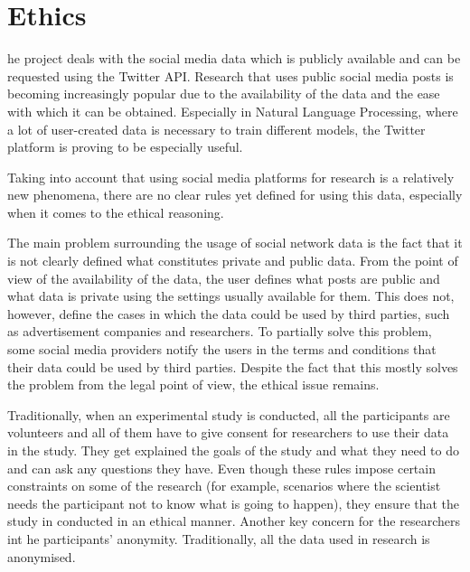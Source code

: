 \let\textcircled=\pgftextcircled
\chapter{Ethics}
\label{chap:ethics}

he project deals with the social media data which is publicly available and can be requested using the Twitter API. Research that uses public social media posts is becoming increasingly popular due to the availability of the data and the ease with which it can be obtained. Especially in Natural Language Processing, where a lot of user-created data is necessary to train different models, the Twitter platform is proving to be especially useful. 

Taking into account that using social media platforms for research is a relatively new phenomena, there are no clear rules yet defined for using this data, especially when it comes to the ethical reasoning. 

The main problem surrounding the usage of social network data is the fact that it is not clearly defined what constitutes private and public data. From the point of view of the availability of the data, the user defines what posts are public and what data is private using the settings usually available for them. This does not, however, define the cases in which the data could be used by third parties, such as advertisement companies and researchers. To partially solve this problem, some social media providers notify the users in the terms and conditions that their data could be used by third parties. Despite the fact that this mostly solves the problem from the legal point of view, the ethical issue remains. 

Traditionally, when an experimental study is conducted, all the participants are volunteers and all of them have to give consent for researchers to use their data in the study. They get explained the goals of the study and what they need to do and can ask any questions they have. Even though these rules impose certain constraints on some of the research (for example, scenarios where the scientist needs the participant not to know what is going to happen), they ensure that the study in conducted in an ethical manner. Another key concern for the researchers int he participants' anonymity. Traditionally, all the data used in research is anonymised. 

